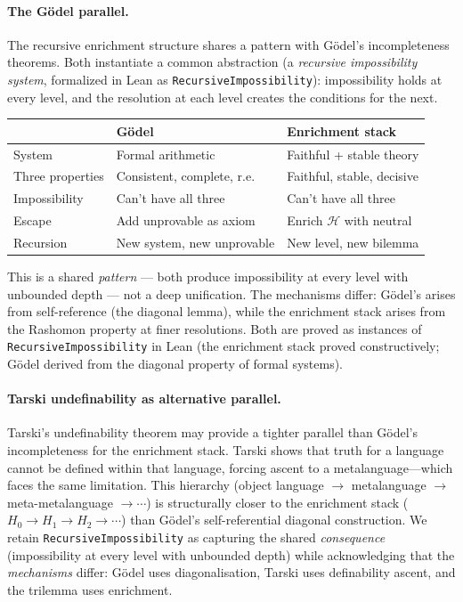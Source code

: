\documentclass[11pt,a4paper]{article}
\newcommand{\sH}{\mathcal{H}}
\begin{document}
\paragraph{The Gödel parallel.}
The recursive enrichment structure shares a pattern with Gödel's incompleteness theorems. Both instantiate a common abstraction (a \emph{recursive impossibility system}, formalized in Lean as \texttt{RecursiveImpossibility}): impossibility holds at every level, and the resolution at each level creates the conditions for the next.

\begin{center}
\begin{tabular}{@{}lll@{}}
\toprule
 & \textbf{Gödel} & \textbf{Enrichment stack} \\
\midrule
System & Formal arithmetic & Faithful + stable theory \\
Three properties & Consistent, complete, r.e. & Faithful, stable, decisive \\
Impossibility & Can't have all three & Can't have all three \\
Escape & Add unprovable as axiom & Enrich $\sH$ with neutral \\
Recursion & New system, new unprovable & New level, new bilemma \\
\bottomrule
\end{tabular}
\end{center}

This is a shared \emph{pattern} --- both produce impossibility at every level with unbounded depth --- not a deep unification. The mechanisms differ: Gödel's arises from self-reference (the diagonal lemma), while the enrichment stack arises from the Rashomon property at finer resolutions. Both are proved as instances of \texttt{RecursiveImpossibility} in Lean (the enrichment stack proved constructively; Gödel derived from the diagonal property of formal systems).

\paragraph{Tarski undefinability as alternative parallel.}
Tarski's undefinability theorem may provide a tighter parallel than G\"odel's incompleteness for the enrichment stack. Tarski shows that truth for a language cannot be defined within that language, forcing ascent to a metalanguage---which faces the same limitation. This hierarchy (object language $\to$ metalanguage $\to$ meta-metalanguage $\to \cdots$) is structurally closer to the enrichment stack ($H_0 \to H_1 \to H_2 \to \cdots$) than G\"odel's self-referential diagonal construction. We retain \texttt{RecursiveImpossibility} as capturing the shared \emph{consequence} (impossibility at every level with unbounded depth) while acknowledging that the \emph{mechanisms} differ: G\"odel uses diagonalisation, Tarski uses definability ascent, and the trilemma uses enrichment.
\end{document}
